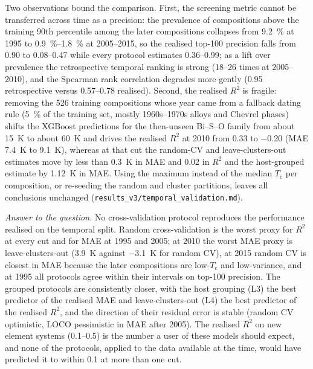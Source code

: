 \documentclass{iopjournal}
\newcommand{\Tc}{T_{\mathrm c}}
\newcommand{\Rsq}{R^{2}}
\begin{document}
Two observations bound the comparison. First, the screening metric cannot be transferred across
time as a precision: the prevalence of compositions above the training 90th percentile among the
later compositions collapses from \SI{9.2}{\percent} at 1995 to \SIrange{0.9}{1.8}{\percent} at
2005--2015, so the realised top-\num{100} precision falls from \num{0.90} to \numrange{0.08}{0.47}
while every protocol estimates \numrange{0.36}{0.99}; as a lift over prevalence the
retrospective temporal ranking is strong (\numrange{18}{26} times at 2005--2010), and the Spearman rank
correlation degrades more gently (\num{0.95} retrospective versus \numrange{0.57}{0.78} realised).
Second, the realised $\Rsq$ is fragile: removing the \num{526} training compositions whose year came
from a fallback dating rule (\SI{5}{\percent} of the training set, mostly 1960s--1970s alloys and
Chevrel phases) shifts the XGBoost predictions for the then-unseen Bi--S--O family from about
\SI{15}{\kelvin} to about \SI{60}{\kelvin} and drives the realised $\Rsq$ at 2010 from \num{0.33}
to \num{-0.20} (MAE \SI{7.4}{\kelvin} to \SI{9.1}{\kelvin}), whereas at that cut the random-CV and leave-clusters-out estimates move by less than \SI{0.3}{\kelvin} in MAE and \num{0.02} in $\Rsq$ and the host-grouped estimate by \SI{1.12}{\kelvin} in MAE.
Using the maximum instead of the median $\Tc$ per composition, or re-seeding the random and cluster
partitions, leaves all conclusions unchanged (\texttt{results\_v3/temporal\_validation.md}).

\emph{Answer to the question.} No cross-validation protocol reproduces the performance realised on the temporal split. Random cross-validation is the worst proxy for $\Rsq$ at every cut and for MAE at 1995
and 2005; at 2010 the worst MAE proxy is leave-clusters-out (\SI{+3.9}{\kelvin} against
\SI{-3.1}{\kelvin} for random CV), at 2015 random CV is closest in MAE because the later
compositions are low-$\Tc$ and low-variance, and at 1995 all protocols agree within their intervals
on top-\num{100} precision. The grouped protocols are consistently closer, with the host grouping
(L3) the best predictor of the realised MAE and leave-clusters-out (L4) the best predictor of the
realised $\Rsq$, and the direction of their residual error is stable (random CV optimistic, LOCO
pessimistic in MAE after 2005). The realised $\Rsq$ on new element systems
(\numrange{0.1}{0.5}) is the number a user of these models should expect, and none of the
protocols, applied to the data available at the time, would have predicted it to within \num{0.1}
at more than one cut.
\end{document}
